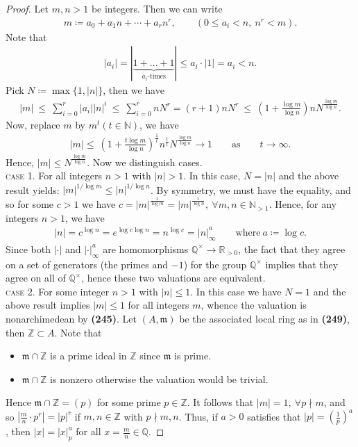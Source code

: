 \documentclass[12pt,a4paper,footinclude=true,headinclude=true]{scrbook} %
\begin{document}
\begin{proof}
    Let $m,n>1$ be integers. Then we can write
    \begin{align*}
        m\coloneqq a_0+a_1n+\cdots+a_rn^r,\qquad(0\leq a_i<n,\ n^r<m).
    \end{align*}
    Note that
    \begin{align*}
        |a_i|=|\underbrace{1+\ldots+1}_{a_i\text{-times}}|\leq a_i\cdot|1|=a_i<n.
    \end{align*}
    Pick $N\coloneqq\max\{1,|n|\}$, then we have
    \begin{align*}
        |m|\ \leq\ \sum_{i=0}^r|a_i||n|^i\ \leq\ \sum_{i=0}^rnN^r=(r+1)nN^r\ 
        \leq\ (1+\tfrac{\log m}{\log n})nN^{\frac{\log m}{\log n}}.
    \end{align*}
    Now, replace $m$ by $m^t (t\in\mathbb{N})$, we have
    \begin{align*}
        |m|\leq\ (1+\tfrac{t\log m}{\log n})^{\frac{1}{t}}n^{\frac{1}{t}}N^{\frac{\log m}{\log n}}\to1\qquad\text{as}\qquad t\to\infty.
    \end{align*}
    Hence, $|m|\leq N^\frac{\log m}{\log n}$. Now we distinguish cases.\\
    \textsc{case 1.} For all integers $n>1$ with $|n|>1$. In this case, $N=|n|$ and the above result yields: $|m|^{1/\log m}\leq|n|^{1/\log n}$. By symmetry, we must have the equality, and so for some $c>1$ we have $c=|m|^{\frac{1}{\log m}}=|m|^{\frac{1}{\log n}},\ \forall m,n\in\mathbb{N}_{>1}$. Hence, for any integers $n>1$, we have 
    \begin{align*}
        |n|=c^{\log n}=e^{\log c\log n}=n^{\log c}=|n|_\infty^a\qquad \text{where}\ a\coloneqq\log c.
    \end{align*}
    Since both $|\cdot|$ and $|\cdot|_\infty^a$ are homomorphisms $\mathbb{Q}^\times\to\mathbb{R}_{>0}$, the fact that they agree on a set of generators (the primes and $-1$) for the group $\mathbb{Q}^\times$ implies that they agree on all of $\mathbb{Q}^\times$, hence these two valuations are equivalent.\\
    \textsc{case 2.} For some integer $n>1$ with $|n|\leq1$. In this case we have $N=1$ and the above result implies $|m|\leq1$ for all integers $m$, whence the valuation is nonarchimedean by \textbf{(245)}. Let $(A,\mathfrak{m})$ be the associated local ring as in \textbf{(249)}, then $\mathbb{Z}\subset A$. Note that 
    \begin{itemize}
        \item $\mathfrak{m}\cap\mathbb{Z}$ is a prime ideal in $\mathbb{Z}$ since $\mathfrak{m}$ is prime.
        \item $\mathfrak{m}\cap\mathbb{Z}$ is nonzero otherwise the valuation would be trivial.
    \end{itemize}
    Hence $\mathfrak{m}\cap\mathbb{Z}=(p)$ for some prime $p\in\mathbb{Z}$. It follows that $|m|=1,\ \forall p\nmid m$, and so $|\frac{m}{n}\cdot p^r|=|p|^r$ if $m,n\in\mathbb{Z}$ with $p\nmid m,n$. Thus, if $a>0$ satisfies that $|p|=(\frac{1}{p})^a$, then $|x|=|x|_p^a$ for all $x=\frac{m}{n}\in\mathbb{Q}$.
\end{proof}
\end{document}

